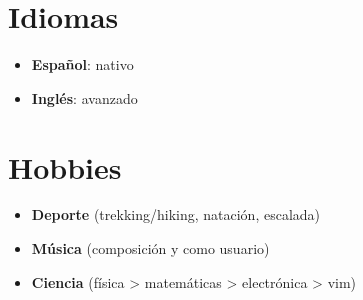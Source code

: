 \documentclass[letterpaper]{twentysecondcv} %
\begin{document}
\section{Idiomas}
\begin{itemize}
    \item \textbf{Español}: nativo
    \item \textbf{Inglés}: avanzado
\end{itemize}


\section{Hobbies}
\begin{itemize}
    \item \textbf{Deporte} (trekking/hiking, natación, escalada)
    \item \textbf{Música} (composición y como usuario)
    \item \textbf{Ciencia} (física > matemáticas > electrónica > vim)
\end{itemize}
\end{document}
